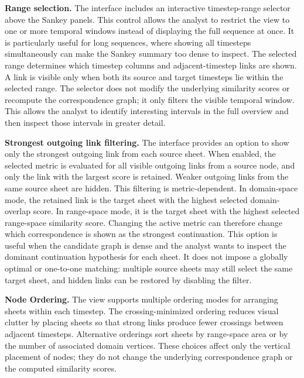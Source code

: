 \documentclass{vgtc}                          %
\newcommand{\myparagraph}[1]{\vspace{1mm} \noindent \textbf{#1}}
\begin{document}
\myparagraph{Range selection.} The interface includes an interactive timestep-range selector above the Sankey panels. This control allows the analyst to restrict the view to one or more temporal windows instead of displaying the full sequence at once. It is particularly useful for long sequences, where showing all timesteps simultaneously can make the Sankey summary too dense to inspect. The selected range determines which timestep columns and adjacent-timestep links are shown. A link is visible only when both its source and target timesteps lie within the selected range. The selector does not modify the underlying similarity scores or recompute the correspondence graph; it only filters the visible temporal window. This allows the analyst to identify interesting intervals in the full overview and then inspect those intervals in greater detail.


\myparagraph{Strongest outgoing link filtering.}
The interface provides an option to show only the strongest outgoing link from each source sheet. When enabled, the selected metric is evaluated for all visible outgoing links from a source node, and only the link with the largest score is retained. Weaker outgoing links from the same source sheet are hidden. This filtering is metric-dependent. In domain-space mode, the retained link is the target sheet with the highest selected domain-overlap score. In range-space mode, it is the target sheet with the highest selected range-space similarity score. Changing the active metric can therefore change which correspondence is shown as the strongest continuation. This option is useful when the candidate graph is dense and the analyst wants to inspect the dominant continuation hypothesis for each sheet. It does not impose a globally optimal or one-to-one matching: multiple source sheets may still select the same target sheet, and hidden links can be restored by disabling the filter.


\myparagraph{Node Ordering.} The view supports multiple ordering modes for arranging sheets within each timestep. The crossing-minimized ordering reduces visual clutter by placing sheets so that strong links produce fewer crossings between adjacent timesteps. Alternative orderings sort sheets by range-space area or by the number of associated domain vertices. These choices affect only the vertical placement of nodes; they do not change the underlying correspondence graph or the computed similarity scores.
\end{document}
